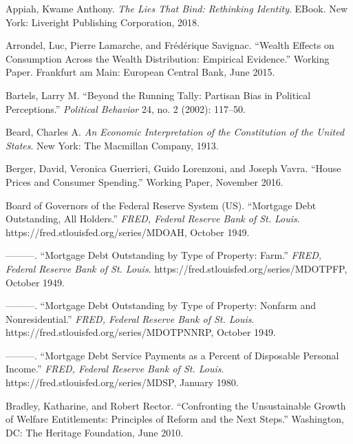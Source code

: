 \documentclass[12pt,oneside]{psthesis}
\begin{document}
\leavevmode\hypertarget{ref-appiah2018lies}{}%
Appiah, Kwame Anthony. \emph{The Lies That Bind: Rethinking Identity}. EBook. New York: Liveright Publishing Corporation, 2018.

\leavevmode\hypertarget{ref-arrondel2015wealth}{}%
Arrondel, Luc, Pierre Lamarche, and Frédérique Savignac. ``Wealth Effects on Consumption Across the Wealth Distribution: Empirical Evidence.'' Working Paper. Frankfurt am Main: European Central Bank, June 2015.

\leavevmode\hypertarget{ref-bartels2002running}{}%
Bartels, Larry M. ``Beyond the Running Tally: Partisan Bias in Political Perceptions.'' \emph{Political Behavior} 24, no. 2 (2002): 117--50.

\leavevmode\hypertarget{ref-beard1913economic}{}%
Beard, Charles A. \emph{An Economic Interpretation of the Constitution of the United States}. New York: The Macmillan Company, 1913.

\leavevmode\hypertarget{ref-berger2016house}{}%
Berger, David, Veronica Guerrieri, Guido Lorenzoni, and Joseph Vavra. ``House Prices and Consumer Spending.'' Working Paper, November 2016.

\leavevmode\hypertarget{ref-boardofgovernorsofthefederalreservesystemus1949mortgagec}{}%
Board of Governors of the Federal Reserve System (US). ``Mortgage Debt Outstanding, All Holders.'' \emph{FRED, Federal Reserve Bank of St. Louis}. https://fred.stlouisfed.org/series/MDOAH, October 1949.

\leavevmode\hypertarget{ref-boardofgovernorsofthefederalreservesystemus1949mortgagea}{}%
---------. ``Mortgage Debt Outstanding by Type of Property: Farm.'' \emph{FRED, Federal Reserve Bank of St. Louis}. https://fred.stlouisfed.org/series/MDOTPFP, October 1949.

\leavevmode\hypertarget{ref-boardofgovernorsofthefederalreservesystemus1949mortgageb}{}%
---------. ``Mortgage Debt Outstanding by Type of Property: Nonfarm and Nonresidential.'' \emph{FRED, Federal Reserve Bank of St. Louis}. https://fred.stlouisfed.org/series/MDOTPNNRP, October 1949.

\leavevmode\hypertarget{ref-boardofgovernorsofthefederalreservesystemus1980mortgage}{}%
---------. ``Mortgage Debt Service Payments as a Percent of Disposable Personal Income.'' \emph{FRED, Federal Reserve Bank of St. Louis}. https://fred.stlouisfed.org/series/MDSP, January 1980.

\leavevmode\hypertarget{ref-bradley2010confronting}{}%
Bradley, Katharine, and Robert Rector. ``Confronting the Unsustainable Growth of Welfare Entitlements: Principles of Reform and the Next Steps.'' Washington, DC: The Heritage Foundation, June 2010.
\end{document}
